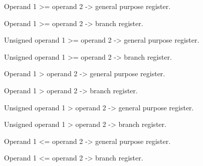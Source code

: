 Operand 1 >= operand 2 -> general purpose register.

Operand 1 >= operand 2 -> branch register.

Unsigned operand 1 >= operand 2 -> general purpose register.

Unsigned operand 1 >= operand 2 -> branch register.

Operand 1 > operand 2 -> general purpose register.

Operand 1 > operand 2 -> branch register.

Unsigned operand 1 > operand 2 -> general purpose register.

Unsigned operand 1 > operand 2 -> branch register.

Operand 1 <= operand 2 -> general purpose register.

Operand 1 <= operand 2 -> branch register.

